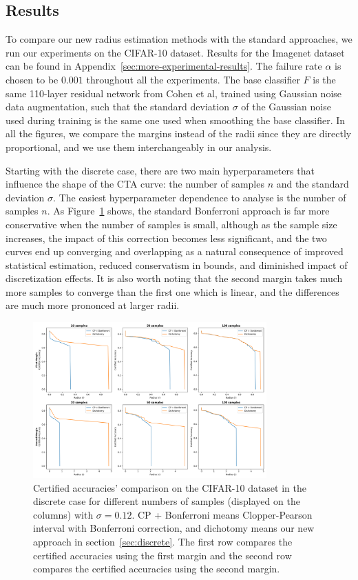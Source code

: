\subsection{Results}\label{subsec:results}

To compare our new radius estimation methods with the standard approaches, we run our experiments on the CIFAR-10 dataset.
Results for the Imagenet dataset can be found in Appendix~\ref{sec:more-experimental-results}.
The failure rate $\alpha$ is chosen to be $0.001$ throughout all the experiments.
The base classifier $F$ is the same 110-layer residual network from Cohen et al, trained using Gaussian noise data augmentation, such that the standard deviation $\sigma$ of the Gaussian noise used during training is the same one used when smoothing the base classifier.
In all the figures, we compare the margins instead of the radii since they are directly proportional, and we use them interchangeably in our analysis.

Starting with the discrete case, there are two main hyperparameters that influence the shape of the CTA curve: the number of samples $n$ and the standard deviation $\sigma$.
The easiest hyperparameter dependence to analyse is the number of samples $n$.
As Figure~\ref{fig:discrete_num} shows, the standard Bonferroni approach is far more conservative when the number of samples is small, although as the sample size increases, the impact of this correction becomes less significant, and the two curves end up converging and overlapping as a natural consequence of improved statistical estimation, reduced conservatism in bounds, and diminished impact of discretization effects.
It is also worth noting that the second margin takes much more samples to converge than the first one which is linear, and the differences are much more prononced at larger radii.

\begin{figure}[htbp]
    \centering
    \includegraphics[width=0.8\textwidth]{images/discrete_num}
    \caption{Certified accuracies' comparison on the CIFAR-10 dataset in the discrete case for different numbers of samples (displayed on the columns) with $\sigma = 0.12$. CP + Bonferroni means Clopper-Pearson interval with Bonferroni correction, and dichotomy means our new approach in section~\ref{sec:discrete}. The first row compares the certified accuracies using the first margin and the second row compares the certified accuracies using the second margin.}
    \label{fig:discrete_num}
\end{figure}

